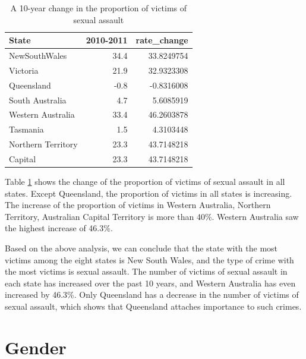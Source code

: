\documentclass[11pt,a4paper,]{article}
\begin{document}
\begin{table}

\caption{\label{tab:table3}A 10-year change in the proportion of victims of sexual assault}
\centering
\begin{tabular}[t]{lrr}
\toprule
State & 2010-2011 & rate\_change\\
\midrule
NewSouthWales & 34.4 & 33.8249754\\
Victoria & 21.9 & 32.9323308\\
Queensland & -0.8 & -0.8316008\\
South Australia & 4.7 & 5.6085919\\
Western Australia & 33.4 & 46.2603878\\
\addlinespace
Tasmania & 1.5 & 4.3103448\\
Northern Territory & 23.3 & 43.7148218\\
Capital & 23.3 & 43.7148218\\
\bottomrule
\end{tabular}
\end{table}

Table \ref{tab:table3} shows the change of the proportion of victims of sexual assault in all states. Except Queensland, the proportion of victims in all states is increasing. The increase of the proportion of victims in Western Australia, Northern Territory, Australian Capital Territory is more than 40\%. Western Australia saw the highest increase of 46.3\%.

Based on the above analysis, we can conclude that the state with the most victims among the eight states is New South Wales, and the type of crime with the most victims is sexual assault. The number of victims of sexual assault in each state has increased over the past 10 years, and Western Australia has even increased by 46.3\%. Only Queensland has a decrease in the number of victims of sexual assault, which shows that Queensland attaches importance to such crimes.

\clearpage

\section*{Gender}
\end{document}
